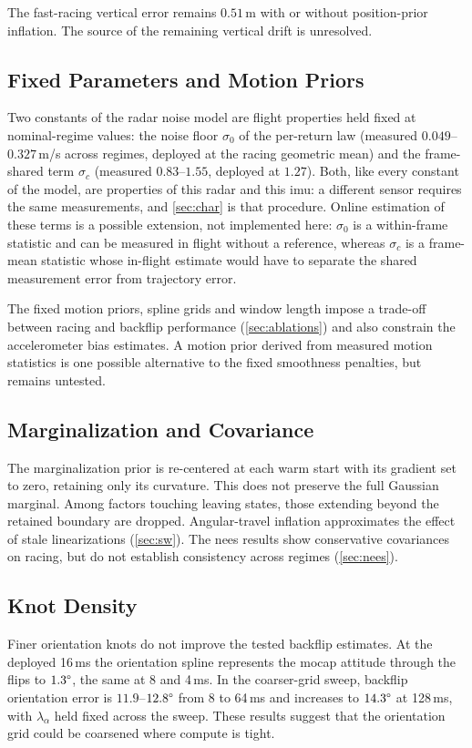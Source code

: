 The fast-racing vertical error remains $0.51$\,m with or without
position-prior inflation.
The source of the remaining vertical drift is unresolved.

\subsection{Fixed Parameters and Motion Priors}
\label{sec:fixed_constants}
Two constants of the radar noise model are flight properties held
fixed at nominal-regime values: the noise floor $\sigma_0$ of the
per-return law (measured $0.049$--$0.327$\,m/s across regimes, deployed
at the racing geometric mean) and the frame-shared term $\sigma_c$
(measured $0.83$--$1.55$, deployed at $1.27$).  Both, like every
constant of the model, are properties of this radar and this
\ac{imu}: a different sensor requires the same measurements, and
\autoref{sec:char} is that procedure.  Online estimation
of these terms is a possible extension, not implemented here:
$\sigma_0$ is a within-frame statistic and can be measured in flight
without a reference, whereas $\sigma_c$ is a frame-mean statistic whose
in-flight estimate would have to separate the shared measurement error
from trajectory error.

The fixed motion priors, spline grids and window length
impose a trade-off between
racing and backflip performance (\autoref{sec:ablations}) and also
constrain the accelerometer bias estimates.  A motion prior derived
from measured motion statistics is one possible alternative to the
fixed smoothness penalties, but remains untested.

\subsection{Marginalization and Covariance}
\label{sec:marg_limits}
The marginalization prior is re-centered at each warm start with
its gradient set to zero, retaining only its curvature.  This does
not preserve the full Gaussian marginal.  Among factors touching
leaving states, those extending beyond the retained boundary are
dropped.  Angular-travel inflation approximates the effect of stale
linearizations (\autoref{sec:sw}).
The \ac{nees} results show conservative covariances on racing, but
do not establish consistency across regimes (\autoref{sec:nees}).

\subsection{Knot Density}
\label{sec:negative}
Finer orientation knots do not improve the tested backflip estimates.
At the deployed 16\,ms the orientation spline represents the \ac{mocap}
attitude through the flips to $1.3\degree$, the same at 8 and 4\,ms.
In the coarser-grid sweep, backflip orientation error is
$11.9$--$12.8\degree$ from 8 to 64\,ms and increases to $14.3\degree$
at 128\,ms, with $\lambda_\alpha$ held fixed across the sweep.
These results suggest that the orientation grid could be coarsened
where compute is tight.
